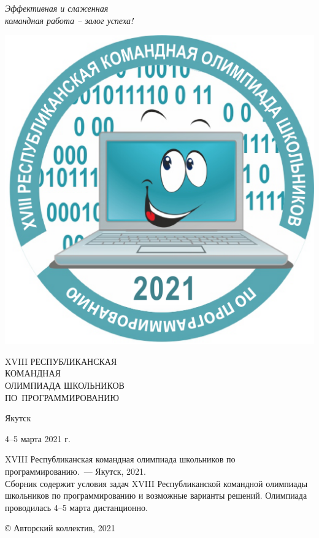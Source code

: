 \documentclass[a5paper, twoside, 11pt]{article}
\begin{document}
\pagestyle{empty}

\begin{flushright}
\it
Эффективная и слаженная\\
командная работа -- залог успеха!
\end{flushright}
{}\vskip-18mm

\includegraphics[scale=0.15]{logo.png}
\\[3cm]

\begin{center}
\huge
XVIII РЕСПУБЛИКАНСКАЯ \\КОМАНДНАЯ\\ОЛИМПИАДА ШКОЛЬНИКОВ \\
ПО~ПРОГРАММИРОВАНИЮ
\end{center}

\vfill
\centerline{Якутск}
\centerline{4--5 марта 2021 г.}
\newpage
\noindent XVIII Республиканская командная олимпиада школьников по программированию.~--- Якутск, 2021.
\\[5mm]
Сборник содержит условия задач XVIII Республиканской командной олимпиады школьников по программированию и возможные варианты решений. Олимпиада проводилась 4--5 марта дистанционно.
\vfill

{}\hfill © Авторский коллектив, 2021

\newpage

\end{document}
